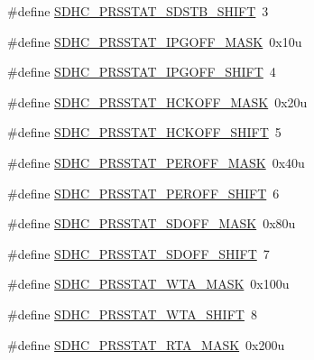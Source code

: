 \begin{DoxyCompactItemize}
\item 
\#define \hyperlink{group___s_d_h_c___register___masks_ga4857c2040b9dc29336795fba391dd1ca}{S\+D\+H\+C\+\_\+\+P\+R\+S\+S\+T\+A\+T\+\_\+\+S\+D\+S\+T\+B\+\_\+\+S\+H\+I\+FT}~3
\item 
\#define \hyperlink{group___s_d_h_c___register___masks_ga60c111aa5a4259d9b556a30aa9cbf891}{S\+D\+H\+C\+\_\+\+P\+R\+S\+S\+T\+A\+T\+\_\+\+I\+P\+G\+O\+F\+F\+\_\+\+M\+A\+SK}~0x10u
\item 
\#define \hyperlink{group___s_d_h_c___register___masks_gab62b9ee7261708d8741ea70ecb103520}{S\+D\+H\+C\+\_\+\+P\+R\+S\+S\+T\+A\+T\+\_\+\+I\+P\+G\+O\+F\+F\+\_\+\+S\+H\+I\+FT}~4
\item 
\#define \hyperlink{group___s_d_h_c___register___masks_ga3fea3ced329a19b4f5ef4b596afa1487}{S\+D\+H\+C\+\_\+\+P\+R\+S\+S\+T\+A\+T\+\_\+\+H\+C\+K\+O\+F\+F\+\_\+\+M\+A\+SK}~0x20u
\item 
\#define \hyperlink{group___s_d_h_c___register___masks_gac28dd17af6a554003b82c5ef2a8a29ff}{S\+D\+H\+C\+\_\+\+P\+R\+S\+S\+T\+A\+T\+\_\+\+H\+C\+K\+O\+F\+F\+\_\+\+S\+H\+I\+FT}~5
\item 
\#define \hyperlink{group___s_d_h_c___register___masks_ga6561c88825587d265f09036e40dc741a}{S\+D\+H\+C\+\_\+\+P\+R\+S\+S\+T\+A\+T\+\_\+\+P\+E\+R\+O\+F\+F\+\_\+\+M\+A\+SK}~0x40u
\item 
\#define \hyperlink{group___s_d_h_c___register___masks_ga5fbe36972520968a101550517bd82895}{S\+D\+H\+C\+\_\+\+P\+R\+S\+S\+T\+A\+T\+\_\+\+P\+E\+R\+O\+F\+F\+\_\+\+S\+H\+I\+FT}~6
\item 
\#define \hyperlink{group___s_d_h_c___register___masks_ga97dde8a6d23e4744d4988349d9d6f581}{S\+D\+H\+C\+\_\+\+P\+R\+S\+S\+T\+A\+T\+\_\+\+S\+D\+O\+F\+F\+\_\+\+M\+A\+SK}~0x80u
\item 
\#define \hyperlink{group___s_d_h_c___register___masks_ga8a5f8108789275435c30d3997c194b12}{S\+D\+H\+C\+\_\+\+P\+R\+S\+S\+T\+A\+T\+\_\+\+S\+D\+O\+F\+F\+\_\+\+S\+H\+I\+FT}~7
\item 
\#define \hyperlink{group___s_d_h_c___register___masks_gae6ab1f30d29da8d10ad0985318d09c30}{S\+D\+H\+C\+\_\+\+P\+R\+S\+S\+T\+A\+T\+\_\+\+W\+T\+A\+\_\+\+M\+A\+SK}~0x100u
\item 
\#define \hyperlink{group___s_d_h_c___register___masks_ga52a878b9915b1b1dd257b24abb21a33f}{S\+D\+H\+C\+\_\+\+P\+R\+S\+S\+T\+A\+T\+\_\+\+W\+T\+A\+\_\+\+S\+H\+I\+FT}~8
\item 
\#define \hyperlink{group___s_d_h_c___register___masks_gad374f3cdffc3be8138708bf632b303be}{S\+D\+H\+C\+\_\+\+P\+R\+S\+S\+T\+A\+T\+\_\+\+R\+T\+A\+\_\+\+M\+A\+SK}~0x200u

\end{DoxyCompactItemize}
